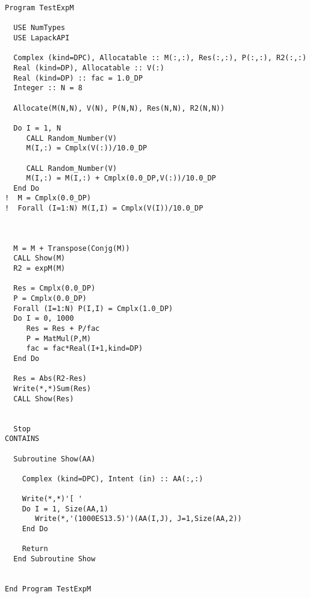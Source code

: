 \begin{lstlisting}[emph=expM,
                   emphstyle=\color{blue},
                   frame=trBL,
                   caption=Using lapack library to exponentiate matrices.,
                   label=expm]
Program TestExpM

  USE NumTypes
  USE LapackAPI

  Complex (kind=DPC), Allocatable :: M(:,:), Res(:,:), P(:,:), R2(:,:)
  Real (kind=DP), Allocatable :: V(:)
  Real (kind=DP) :: fac = 1.0_DP
  Integer :: N = 8
  
  Allocate(M(N,N), V(N), P(N,N), Res(N,N), R2(N,N))

  Do I = 1, N
     CALL Random_Number(V)
     M(I,:) = Cmplx(V(:))/10.0_DP

     CALL Random_Number(V)
     M(I,:) = M(I,:) + Cmplx(0.0_DP,V(:))/10.0_DP
  End Do
!  M = Cmplx(0.0_DP)
!  Forall (I=1:N) M(I,I) = Cmplx(V(I))/10.0_DP



  M = M + Transpose(Conjg(M))
  CALL Show(M)
  R2 = expM(M)

  Res = Cmplx(0.0_DP)
  P = Cmplx(0.0_DP)
  Forall (I=1:N) P(I,I) = Cmplx(1.0_DP)
  Do I = 0, 1000
     Res = Res + P/fac
     P = MatMul(P,M)
     fac = fac*Real(I+1,kind=DP)
  End Do
  
  Res = Abs(R2-Res)
  Write(*,*)Sum(Res)
  CALL Show(Res)


  Stop
CONTAINS
  
  Subroutine Show(AA)

    Complex (kind=DPC), Intent (in) :: AA(:,:)

    Write(*,*)'[ '
    Do I = 1, Size(AA,1)
       Write(*,'(1000ES13.5)')(AA(I,J), J=1,Size(AA,2))
    End Do

    Return
  End Subroutine Show


End Program TestExpM
\end{lstlisting}






